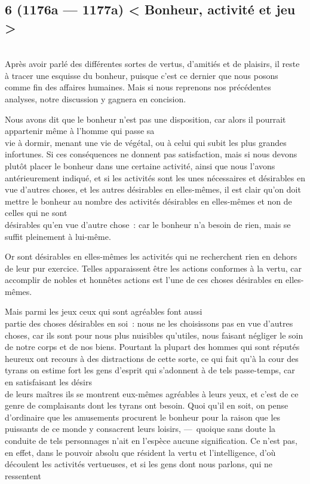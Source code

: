 \documentclass[french,twoside]{book} %
\begin{document}
\subsection[{6 (1176a — 1177a) < Bonheur, activité et jeu >}]{6 (1176a — 1177a) < Bonheur, activité et jeu >}
\noindent \\
Après avoir parlé des différentes sortes de vertus, d’amitiés et de plaisirs, il reste à tracer une esquisse du bonheur, puisque c’est ce dernier que nous posons comme fin des affaires humaines. Mais si nous reprenons nos précédentes analyses, notre discussion y gagnera en concision.\par
Nous avons dit que le bonheur n’est pas une disposition, car alors il pourrait appartenir même à l’homme qui passe sa \\
vie à dormir, menant une vie de végétal, ou à celui qui subit les plus grandes infortunes. Si ces conséquences ne donnent pas  satisfaction, mais si nous devons plutôt placer le bonheur dans une certaine activité, ainsi que nous l’avons antérieurement indiqué, et si les activités sont les unes nécessaires et désirables en vue d’autres choses, et les autres désirables en elles-mêmes, il est clair qu’on doit mettre le bonheur au nombre des activités désirables en elles-mêmes et non de celles qui ne sont \\
désirables qu’en vue d’autre chose : car le bonheur n’a besoin de rien, mais se suffit pleinement à lui-même.\par
Or sont désirables en elles-mêmes les activités qui ne recherchent rien en dehors de leur pur exercice. Telles apparaissent être les actions conformes à la vertu, car accomplir de nobles et honnêtes actions est l’une de ces choses désirables en elles-mêmes.\par
Mais parmi les jeux ceux qui sont agréables font aussi \\
partie des choses désirables en soi : nous ne les choisissons pas en vue d’autres choses, car ils sont pour nous plus nuisibles qu’utiles, nous faisant négliger le soin de notre corps et de nos biens. Pourtant la plupart des hommes qui sont réputés heureux ont recours à des distractions de cette sorte, ce qui fait qu’à la cour des tyrans on estime fort les gens d’esprit qui s’adonnent à de tels passe-temps, car en satisfaisant les désirs \\
de leurs maîtres ils se montrent eux-mêmes agréables à leurs yeux, et c’est de ce genre de complaisants dont les tyrans ont besoin. Quoi qu’il en soit, on pense d’ordinaire que les amusements procurent le bonheur pour la raison que les puissants de ce monde y consacrent leurs loisirs, — quoique sans doute la conduite de tels personnages n’ait en l’espèce aucune signification. Ce n’est pas, en effet, dans le pouvoir absolu que résident la vertu et l’intelligence, d’où découlent les activités vertueuses, et si les gens dont nous parlons, qui ne ressentent \\
\end{document}
